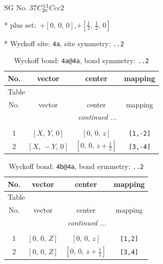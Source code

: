 \documentclass[fleqn,8pt]{jsarticle}
\begin{document}
\setcounter{MaxMatrixCols}{32}

\renewcommand{\tablename}{Table~}
\renewcommand{\figurename}{Figure~}
\begin{center}
\LARGE
SG No. 37\quad$C_{\rm 2v}^{13}$\quad$Ccc2$\quad[ orthorhombic ]
\end{center}

* plus set:\,\,\,$+\left[ 0,\, 0,\, 0 \right]$,\quad $+\left[ \frac{1}{2},\, \frac{1}{2},\, 0 \right]$


* Wyckoff site: {\tt 4a}, site symmetry: {\tt ..2}
\renewcommand{\arraystretch}{1.2}
\begin{longtable}{cccc}
\caption{Wyckoff bond: {\tt 4a@4a}, bond symmetry: {\tt ..2}}
 \\
 \hline \hline
No. & vector & center & mapping \\ \hline \endfirsthead

\multicolumn{3}{l}{\tablename\ \thetable{}} \\
 \hline \hline
No. & vector & center & mapping \\ \hline \endhead

 \hline \hline
\multicolumn{3}{r}{\footnotesize\it continued ...} \\ \endfoot

 \hline \hline
\multicolumn{3}{r}{} \\ \endlastfoot

1 & $\left[ X,\, Y,\, 0 \right]$ & $\left[ 0,\, 0,\, z \right]$ & {\tt [1,-2]} \\ \hline
2 & $\left[ X,\, - Y,\, 0 \right]$ & $\left[ 0,\, 0,\, z + \frac{1}{2} \right]$ & {\tt [3,-4]} \\
\end{longtable}
\renewcommand{\arraystretch}{1.2}
\begin{longtable}{cccc}
\caption{Wyckoff bond: {\tt 4b@4a}, bond symmetry: {\tt ..2}}
 \\
 \hline \hline
No. & vector & center & mapping \\ \hline \endfirsthead

\multicolumn{3}{l}{\tablename\ \thetable{}} \\
 \hline \hline
No. & vector & center & mapping \\ \hline \endhead

 \hline \hline
\multicolumn{3}{r}{\footnotesize\it continued ...} \\ \endfoot

 \hline \hline
\multicolumn{3}{r}{} \\ \endlastfoot

1 & $\left[ 0,\, 0,\, Z \right]$ & $\left[ 0,\, 0,\, z \right]$ & {\tt [1,2]} \\ \hline
2 & $\left[ 0,\, 0,\, Z \right]$ & $\left[ 0,\, 0,\, z + \frac{1}{2} \right]$ & {\tt [3,4]} \\
\end{longtable}
\end{document}

